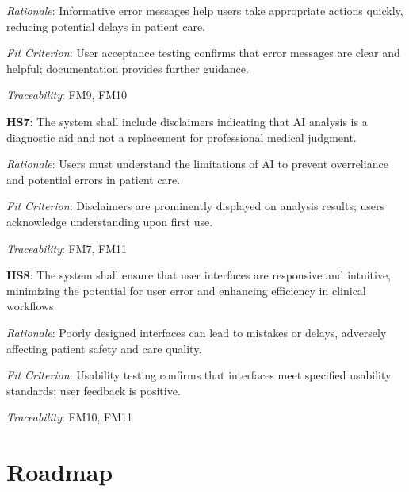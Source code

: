 \documentclass{article}
\begin{document}
\emph{Rationale}: Informative error messages help users take appropriate actions quickly, reducing potential delays in patient care.

\vspace{0.2cm}

\emph{Fit Criterion}: User acceptance testing confirms that error messages are clear and helpful; documentation provides further guidance.

\vspace{0.2cm}

\emph{Traceability}: FM9, FM10

\vspace{0.5cm}

\textbf{HS7}: The system shall include disclaimers indicating that AI analysis is a diagnostic aid and not a replacement for professional medical judgment.

\emph{Rationale}: Users must understand the limitations of AI to prevent overreliance and potential errors in patient care.

\vspace{0.2cm}

\emph{Fit Criterion}: Disclaimers are prominently displayed on analysis results; users acknowledge understanding upon first use.

\vspace{0.2cm}

\emph{Traceability}: FM7, FM11

\vspace{0.5cm}

\textbf{HS8}: The system shall ensure that user interfaces are responsive and intuitive, minimizing the potential for user error and enhancing efficiency in clinical workflows.

\emph{Rationale}: Poorly designed interfaces can lead to mistakes or delays, adversely affecting patient safety and care quality.

\vspace{0.2cm}

\emph{Fit Criterion}: Usability testing confirms that interfaces meet specified usability standards; user feedback is positive.

\vspace{0.2cm}

\emph{Traceability}: FM10, FM11

\vspace{0.5cm}



\section{Roadmap}
\end{document}
